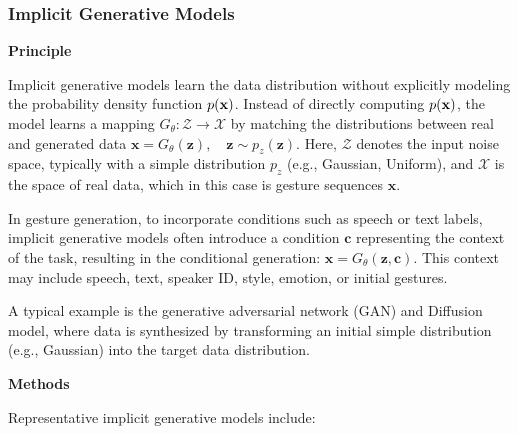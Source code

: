 \subsubsection{Implicit Generative Models}
\label{sec:ImplicitGenerativeModels}

\textbf{Principle}

Implicit generative models learn the data distribution without explicitly modeling the probability density function $p(\mathbf{x})$. Instead of directly computing $p(\mathbf{x})$, the model learns a mapping $G_{\theta}: \mathcal{Z} \to \mathcal{X}$ by matching the distributions between real and generated data $\mathbf{x} = G_\theta(\mathbf{z}), \quad \mathbf{z} \sim p_z(\mathbf{z})$. Here, $\mathcal{Z}$ denotes the input noise space, typically with a simple distribution \(p_{z}\) (e.g., Gaussian, Uniform), and \(\mathcal{X}\) is the space of real data, which in this case is gesture sequences \(\mathbf{x}\).

In gesture generation, to incorporate conditions such as speech or text labels, implicit generative models often introduce a condition $\mathbf{c}$ representing the context of the task, resulting in the conditional generation: $\mathbf{x} = G_\theta(\mathbf{z}, \mathbf{c})$. This context may include speech, text, speaker ID, style, emotion, or initial gestures.

A typical example is the generative adversarial network (GAN) and Diffusion model, where data is synthesized by transforming an initial simple distribution (e.g., Gaussian) into the target data distribution.

\textbf{Methods} 

Representative implicit generative models include:

